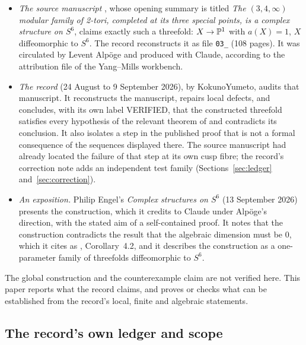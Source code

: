 \begin{itemize}
\item \emph{The source manuscript} \cite{AlpogeS6}, whose opening summary is titled \emph{The $(3,4,\infty)$ modular family of 2-tori, completed at its three special points, is a complex structure on $S^6$}, claims exactly such a threefold: $X\to\mathbb{P}^1$ with $a(X)=1$, $X$ diffeomorphic to $S^6$. The record reconstructs it as file \texttt{03\_} (108 pages). It was circulated by Levent Alpöge and produced with Claude, according to the attribution file of the Yang--Mills workbench.
\item \emph{The record} (24 August to 9 September 2026), by KokunoYumeto, audits that manuscript. It reconstructs the manuscript, repairs local defects, and concludes, with its own label \textsf{VERIFIED}, that the constructed threefold satisfies every hypothesis of the relevant theorem of \cite{CDP20} and contradicts its conclusion. It also isolates a step in the published proof that is not a formal consequence of the sequences displayed there. The source manuscript had already located the failure of that step at its own cusp fibre; the record's correction note adds an independent test family (Sections~\ref{sec:ledger} and~\ref{sec:correction}).
\item \emph{An exposition.} Philip Engel's \emph{Complex structures on $S^6$} (13 September 2026) \cite{EngelS6} presents the construction, which it credits to Claude under Alpöge's direction, with the stated aim of a self-contained proof. It notes that the construction contradicts the result that the algebraic dimension must be $0$, which it cites as \cite{CDP98}, Corollary~4.2, and it describes the construction as a one-parameter family of threefolds diffeomorphic to $S^6$.
\end{itemize}
The global construction and the counterexample claim are not verified here. This paper reports what the record claims, and proves or checks what can be established from the record's local, finite and algebraic statements.

\subsection{The record's own ledger and scope}

